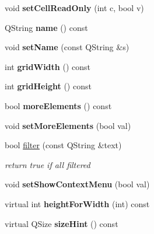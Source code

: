 \begin{DoxyCompactItemize}
void {\bfseries set\+Cell\+Read\+Only} (int c, bool v)
\item 
\mbox{\label{class_ms_1_1_palette_a9c192041ca702452de352663b3eb980d}} 
Q\+String {\bfseries name} () const
\item 
\mbox{\label{class_ms_1_1_palette_ab45bd1b46244229513ec4a905c8bbbc7}} 
void {\bfseries set\+Name} (const Q\+String \&s)
\item 
\mbox{\label{class_ms_1_1_palette_a431b410c5b8141fd7059f5fa7160eec0}} 
int {\bfseries grid\+Width} () const
\item 
\mbox{\label{class_ms_1_1_palette_ab87b5788246015d76a387d17ea15a0e2}} 
int {\bfseries grid\+Height} () const
\item 
\mbox{\label{class_ms_1_1_palette_acff878d1f8fdd6ee62ee41f8fe072942}} 
bool {\bfseries more\+Elements} () const
\item 
\mbox{\label{class_ms_1_1_palette_a182aa8baf362455a883e7917dcc4a397}} 
void {\bfseries set\+More\+Elements} (bool val)
\item 
\mbox{\label{class_ms_1_1_palette_a872cd0c97ee3ab82838b4d6b1699c762}} 
bool \hyperlink{class_ms_1_1_palette_a872cd0c97ee3ab82838b4d6b1699c762}{filter} (const Q\+String \&text)
\begin{DoxyCompactList}\small\item\em return true if all filtered \end{DoxyCompactList}\item 
\mbox{\label{class_ms_1_1_palette_ae165d142702407c319a9aee2ede93899}} 
void {\bfseries set\+Show\+Context\+Menu} (bool val)
\item 
\mbox{\label{class_ms_1_1_palette_a65da917bae1e4d7ac52953709d970dea}} 
virtual int {\bfseries height\+For\+Width} (int) const
\item 
\mbox{\label{class_ms_1_1_palette_aa8bcb840a2603da120d05f879316591f}} 
virtual Q\+Size {\bfseries size\+Hint} () const
\end{DoxyCompactItemize}



